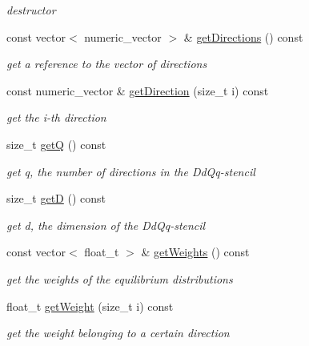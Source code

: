 \begin{DoxyCompactItemize}
\begin{DoxyCompactList}\small\item\em destructor \end{DoxyCompactList}\item 
const vector$<$ numeric\-\_\-vector $>$ \& \hyperlink{classnatrium_1_1BoltzmannModel_aeabed4142acd04a57ba41ca26dfbe666}{get\-Directions} () const 
\begin{DoxyCompactList}\small\item\em get a reference to the vector of directions \end{DoxyCompactList}\item 
const numeric\-\_\-vector \& \hyperlink{classnatrium_1_1BoltzmannModel_a0b258b2c7cc4cba5ac666a06ca2a8f49}{get\-Direction} (size\-\_\-t i) const 
\begin{DoxyCompactList}\small\item\em get the i-\/th direction \end{DoxyCompactList}\item 
size\-\_\-t \hyperlink{classnatrium_1_1BoltzmannModel_ae7cfcd108a085d3215cdc8c00e826107}{get\-Q} () const 
\begin{DoxyCompactList}\small\item\em get q, the number of directions in the \-Dd\-Qq-\/stencil \end{DoxyCompactList}\item 
size\-\_\-t \hyperlink{classnatrium_1_1BoltzmannModel_a8d16745a0dab65cb0324d6b076e53d15}{get\-D} () const 
\begin{DoxyCompactList}\small\item\em get d, the dimension of the \-Dd\-Qq-\/stencil \end{DoxyCompactList}\item 
const vector$<$ float\-\_\-t $>$ \& \hyperlink{classnatrium_1_1BoltzmannModel_a3158e70071707c169486d87d26727f3c}{get\-Weights} () const 
\begin{DoxyCompactList}\small\item\em get the weights of the equilibrium distributions \end{DoxyCompactList}\item 
float\-\_\-t \hyperlink{classnatrium_1_1BoltzmannModel_aae549c1f5dd48a92fc9e174afc5de1a5}{get\-Weight} (size\-\_\-t i) const 
\begin{DoxyCompactList}\small\item\em get the weight belonging to a certain direction \end{DoxyCompactList}\item 

\end{DoxyCompactItemize}
